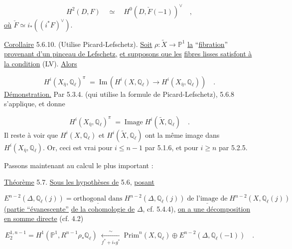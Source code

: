 \begin{equation*}
H^2(D,F) \quad \simeq \quad H^0(D,\check{F}(-1))^{\vee} \quad ,
\end{equation*}
\underline{où} $\check{F} \simeq i_*((i^*F)^{\vee})$.

\underline{Corollaire} 5.6.10. (Utilise Picard-Lefschetz). \underline{Soit} $\rho : \tilde{X} \longrightarrow \mathbb{P}^1$ \underline{la} ``\underline{fibration}'' \underline{provenant d'un pinceau de Lefschetz,} \underline{et supposons que les} \underline{fibres lisses satisfont à la condition} (LV). \underline{Alors}

\begin{equation}\tag{5.6.10.1}
H^i(X_{\bar{\eta}},\mathbb{Q}_\ell)^{\pi} \;=\; \mathrm{Im}\,(H^i(X,\mathbb{Q}_\ell) \longrightarrow H^i(X_{\bar{\eta}},\mathbb{Q}_\ell)) \quad .
\end{equation}
\underline{Démonstration.} Par 5.3.4. (qui utilise la formule de Picard-Lefschetz), 5.6.8 s'applique, et donne

\begin{equation*}
H^i(X_{\bar{\eta}},\mathbb{Q}_\ell)^{\pi} \;=\; \mathrm{Image}\; H^i(\tilde{X},\mathbb{Q}_\ell) \quad .
\end{equation*}
Il reste à voir que $H^i(X,\mathbb{Q}_\ell)$ et $H^i(\tilde{X},\mathbb{Q}_\ell)$ ont la même image dans $H^i(X_{\bar{\eta}},\mathbb{Q}_\ell)$. Or, ceci est vrai pour $i \leq n-1$ par 5.1.6, et pour $i \geq n$ par 5.2.5.

Passons maintenant au calcul le plus important :

\underline{Théorème} 5.7. \underline{Sous les hypothèses de} 5.6, \underline{posant}

\begin{equation*}
E^{n-2}(\Delta,\mathbb{Q}_\ell(j)) = \underline{\mbox{orthogonal dans}}\; H^{n-2}(\Delta,\mathbb{Q}_\ell(j)) \; \underline{\mbox{de l'image de}} \; H^{n-2}(X,\mathbb{Q}_\ell(j))
\end{equation*}
\underline{(partie ``évanescente''} \underline{de la cohomologie de} $\Delta$, cf. 5.4.4), \underline{on a une décomposition en somme directe} (cf. 4.2)

\begin{equation}\tag{5.7.1}
E_2^{1,n-1} = H^1(\mathbb{P}^1, R^{n-1}\rho_*\mathbb{Q}_\ell) \;\xleftarrow[f^*+i_*g^*]{\sim}\; \mathrm{Prim}^n(X,\mathbb{Q}_\ell) \oplus E^{n-2}(\Delta,\mathbb{Q}_\ell(-1)) \quad .
\end{equation}


